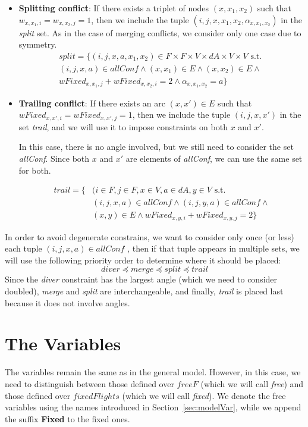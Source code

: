 \documentclass[../thesis.tex]{subfiles}
\begin{document}
\begin{itemize}
    \item \textbf{Splitting conflict}: If there exists a triplet of nodes $(x, x_1, x_2)$ such that $w_{x,x_1,i} = w_{x,x_2,j} = 1$, then we include the tuple $(i,j,x,x_1,x_2, \alpha_{x,x_1,x_2})$ in the \textit{split} set. As in the case of merging conflicts, we consider only one case due to symmetry.
    \begin{align}
        split = \{(i, j, x, a, x_1, x_2) \in F \times F \times V \times dA \times V \times V \text{ s.t. } \nonumber\\
        (i,j,x,a) \in allConf \land (x,x_1) \in E \land (x,x_2) \in E \land \nonumber\\
        wFixed_{x,x_1,j} + wFixed_{x,x_2,i} = 2 \land \alpha_{x,x_1,x_2} = a \}
    \end{align}
    
    \item \textbf{Trailing conflict}: If there exists an arc $(x,x') \in E$ such that $wFixed_{x,x',i} = wFixed_{x,x',j} = 1$, then we include the tuple $(i,j,x,x')$ in the set \textit{trail}, and we will use it to impose constraints on both $x$ and $x'$. 
    
    In this case, there is no angle involved, but we still need to consider the set \textit{allConf}. Since both $x$ and $x'$ are elements of \textit{allConf}, we can use the same set for both.
    
    \begin{align}
        trail = \{ &(i \in F, j \in F, x \in V, a \in dA, y \in V \text{ s.t. } \nonumber\\
        & (i,j,x,a) \in allConf \land (i,j,y,a) \in allConf \land \nonumber\\
        & (x,y) \in E \land wFixed_{x,y,i} + wFixed_{x,y,j} = 2 \}
    \end{align}
\end{itemize}
In order to avoid degenerate constrains, we want to consider only once (or less) each tuple $(i,j,x,a)\in allConf$ , then if that tuple 
appears in multiple sets, we will use the following priority order to determine where it should be placed:  
\[
diver \preceq merge \preceq split \preceq trail
\]
Since the \textit{diver} constraint has the largest angle (which we need to consider doubled), \textit{merge} and \textit{split} are interchangeable, and finally, \textit{trail} is placed last because it does not involve angles.

\section{The Variables}
The variables remain the same as in the general model. However, in this case, we need to distinguish between those defined over $freeF$ (which we will call \textit{free}) and those defined over $fixedFlights$ (which we will call \textit{fixed}). We denote the free variables using the names introduced in Section~\ref{sec:modelVar}, while we append the suffix \textbf{Fixed} to the fixed ones.
\end{document}
